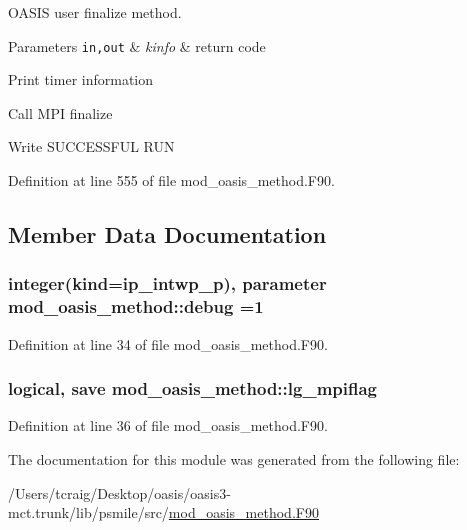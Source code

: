O\+A\+S\+I\+S user finalize method. 


\begin{DoxyParams}[1]{Parameters}
\mbox{\tt in,out}  & {\em kinfo} & return code \\
\hline
\end{DoxyParams}

\begin{DoxyItemize}
\item Print timer information
\item Call M\+P\+I finalize
\item Write S\+U\+C\+C\+E\+S\+S\+F\+U\+L R\+U\+N 
\end{DoxyItemize}

Definition at line 555 of file mod\+\_\+oasis\+\_\+method.\+F90.



\subsection{Member Data Documentation}
\hypertarget{classmod__oasis__method_a390290b92b6af57b2732cb7521532f1c}{
\subsubsection[{debug}]{\setlength{\rightskip}{0pt plus 5cm}integer(kind=ip\+\_\+intwp\+\_\+p), parameter mod\+\_\+oasis\+\_\+method\+::debug =1\hspace{0.3cm}{\ttfamily [private]}}}\label{classmod__oasis__method_a390290b92b6af57b2732cb7521532f1c}


Definition at line 34 of file mod\+\_\+oasis\+\_\+method.\+F90.

\hypertarget{classmod__oasis__method_a2d387aae5e884be0aa69d640a7d3b49f}{
\subsubsection[{lg\+\_\+mpiflag}]{\setlength{\rightskip}{0pt plus 5cm}logical, save mod\+\_\+oasis\+\_\+method\+::lg\+\_\+mpiflag\hspace{0.3cm}{\ttfamily [private]}}}\label{classmod__oasis__method_a2d387aae5e884be0aa69d640a7d3b49f}


Definition at line 36 of file mod\+\_\+oasis\+\_\+method.\+F90.



The documentation for this module was generated from the following file\+:\begin{DoxyCompactItemize}
\item 
/\+Users/tcraig/\+Desktop/oasis/oasis3-\/mct.\+trunk/lib/psmile/src/\hyperlink{mod__oasis__method_8_f90}{mod\+\_\+oasis\+\_\+method.\+F90}\end{DoxyCompactItemize}

